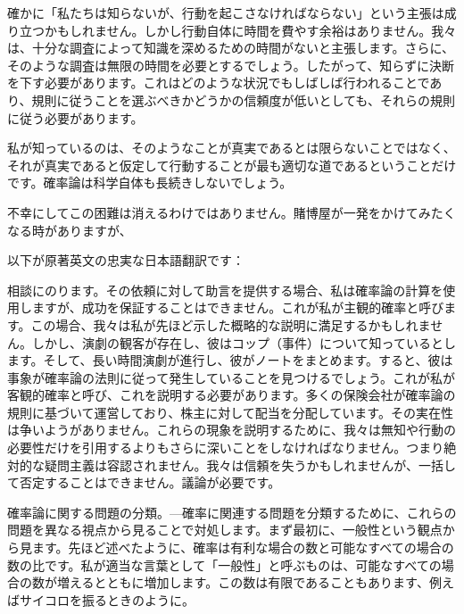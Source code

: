 \documentclass[a4paper,11pt,openany]{ltjsbook}
\begin{document}
確かに「私たちは知らないが、行動を起こさなければならない」という主張は成り立つかもしれません。しかし行動自体に時間を費やす余裕はありません。我々は、十分な調査によって知識を深めるための時間がないと主張します。さらに、そのような調査は無限の時間を必要とするでしょう。したがって、知らずに決断を下す必要があります。これはどのような状況でもしばしば行われることであり、規則に従うことを選ぶべきかどうかの信頼度が低いとしても、それらの規則に従う必要があります。

私が知っているのは、そのようなことが真実であるとは限らないことではなく、それが真実であると仮定して行動することが最も適切な道であるということだけです。確率論は科学自体も長続きしないでしょう。

不幸にしてこの困難は消えるわけではありません。賭博屋が一発をかけてみたくなる時がありますが、


以下が原著英文の忠実な日本語翻訳です：

相談にのります。その依頼に対して助言を提供する場合、私は確率論の計算を使用しますが、成功を保証することはできません。これが私が主観的確率と呼びます。この場合、我々は私が先ほど示した概略的な説明に満足するかもしれません。しかし、演劇の観客が存在し、彼はコップ（事件）について知っているとします。そして、長い時間演劇が進行し、彼がノートをまとめます。すると、彼は事象が確率論の法則に従って発生していることを見つけるでしょう。これが私が客観的確率と呼び、これを説明する必要があります。多くの保険会社が確率論の規則に基づいて運営しており、株主に対して配当を分配しています。その実在性は争いようがありません。これらの現象を説明するために、我々は無知や行動の必要性だけを引用するよりもさらに深いことをしなければなりません。つまり絶対的な疑問主義は容認されません。我々は信頼を失うかもしれませんが、一括して否定することはできません。議論が必要です。

確率論に関する問題の分類。—確率に関連する問題を分類するために、これらの問題を異なる視点から見ることで対処します。まず最初に、一般性という観点から見ます。先ほど述べたように、確率は有利な場合の数と可能なすべての場合の数の比です。私が適当な言葉として「一般性」と呼ぶものは、可能なすべての場合の数が増えるとともに増加します。この数は有限であることもあります、例えばサイコロを振るときのように。
\end{document}
